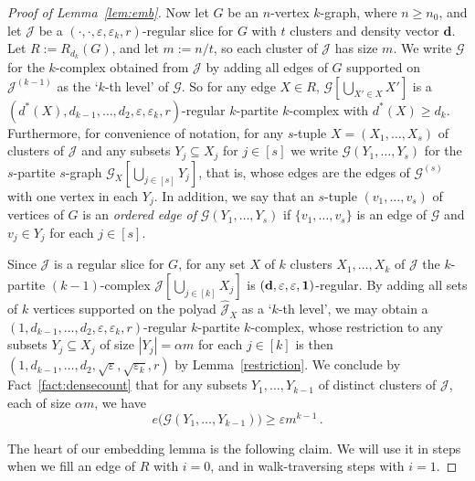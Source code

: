 \documentclass[12pt,a4paper]{amsart}
\let\eps\varepsilon
\newcommand{\cG}{\mathcal{G}}
\newcommand{\cJ}{\mathcal{J}}
\newcommand{\reld}{d^*}
\begin{document}
\begin{proof}[Proof of Lemma~\ref{lem:emb}]
Now let $G$ be an $n$-vertex $k$-graph, where $n \geq n_0$, and let $\cJ$ be a $(\cdot,\cdot,\eps,\eps_k,r)$-regular slice for $G$ with $t$ clusters and density vector $\mathbf{d}$. Let $R:=R_{d_k}(G)$, and let $m := n/t$, so each cluster of $\cJ$ has size $m$. We
write $\cG$ for the $k$-complex obtained from $\cJ$ by adding all edges of $G$ supported on
$\cJ^{(k-1)}$ as the `$k$-th level' of $\cG$. So for any edge $X \in R$,
$\cG[\bigcup_{X' \in X} X']$ is a $(\reld(X), d_{k-1}, \dots, d_2, \eps, \eps_k,
r)$-regular $k$-partite
$k$-complex with $\reld(X) \geq d_k$. Furthermore, for convenience of notation, for any $s$-tuple $X = (X_1,
\dots, X_s)$ of clusters of $\cJ$ and any subsets $Y_j \subseteq X_j$ for $j \in
[s]$  we write $\cG(Y_1, \dots, Y_s)$ for the $s$-partite $s$-graph
$\cG_X[\bigcup_{j \in [s]} Y_j]$, that is, whose edges are the edges of
$\cG^{(s)}$ with one vertex in each $Y_j$. In addition, we say that an
$s$-tuple $(v_1, \dots, v_s)$ of vertices of $G$ is an \emph{ordered edge of} $\cG(Y_1, \dots, Y_s)$
if $\{v_1, \dots, v_s\}$ is an edge of $\cG$ and $v_j \in Y_j$ for each $j \in
[s]$.

Since $\cJ$ is a regular slice for $G$, for any set $X$ of $k$ clusters $X_1, \dots, X_k$ 
of $\cJ$ the $k$-partite $(k-1)$-complex $\cJ[\bigcup_{j \in [k]} X_j]$ is 
$(\bf{d}, \eps, \eps, 1)$-regular. By adding all sets of $k$ vertices supported on the polyad $\hat{\cJ}_X$ as 
a `$k$-th level', we may obtain a $(1, d_{k-1}, \dots, d_2, \eps, \eps_k, r)$-regular 
$k$-partite $k$-complex, whose restriction to any subsets $Y_j \subseteq X_j$ of size 
$|Y_j| = \alpha m$ for each $j \in [k]$ is then 
$(1, d_{k-1}, \dots, d_2, \sqrt{\eps}, \sqrt{\eps_k}, r)$ by Lemma~\ref{restriction}. 
We conclude by Fact~\ref{fact:densecount} that for any subsets $Y_1,\ldots,Y_{k-1}$ of 
distinct clusters of $\cJ$, each of size $\alpha m$, we have
\begin{equation}\label{eq:emb:numedge}
e\big(\cG(Y_1,\ldots,Y_{k-1})\big) \geq \eps m^{k-1}\,.
\end{equation}

The heart of our embedding lemma is the following claim. We will use it in steps when we fill an edge of $R$ with $i=0$, and in walk-traversing steps with $i=1$.


\end{proof}
\end{document}
